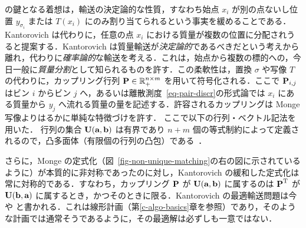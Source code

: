 \citet{Kantorovich42} の鍵となる着想は，輸送の決定論的な性質，すなわち始点 $x_i$ が別の点ないし位置 $y_{\sigma_i}$ または $T(x_i)$ にのみ割り当てられるという事実を緩めることである．Kantorovich は代わりに，任意の点 $x_i$ における質量が複数の位置に分配されうると提案する．Kantorovich は質量輸送が\emph{決定論的}であるべきだという考えから離れ，代わりに\emph{確率論的}な輸送を考える．これは，始点から複数の標的への，今日一般に\emph{質量分割}として知られるものを許す．この柔軟性は，置換 $\sigma$ や写像 $T$ の代わりに，カップリング行列 $\P  \in \RR_+^{n \times m}$ を用いて符号化される．ここで $\P_{i,j}$ はビン $i$ からビン $j$ へ，あるいは離散測度~\eqref{eq-pair-discr}の形式論では $x_i$ にある質量から $y_j$ へ流れる質量の量を記述する．許容されるカップリングは Monge 写像よりはるかに単純な特徴づけを許す．
ここで以下の行列・ベクトル記法を用いた．
行列の集合 $\CouplingsD(\a,\b)$ は有界であり $n+m$ 個の等式制約によって定義されるので，凸多面体（有限個の行列の凸包）である~\citep[\S8.1]{brualdi2006combinatorial}．

%
さらに，Monge の定式化（図~\ref{fig-non-unique-matching}の右の図に示されているように）が本質的に非対称であったのに対し，Kantorovich の緩和した定式化は常に対称的である．すなわち，カップリング $\P$ が $\CouplingsD(\a,\b)$ に属するのは $\transp{\P}$ が $\CouplingsD(\b,\a)$ に属するとき，かつそのときに限る．Kantorovich の最適輸送問題は今や
と書かれる．これは線形計画（第\ref{c-algo-basics}章を参照）であり，そのような計画では通常そうであるように，その最適解は必ずしも一意ではない．

